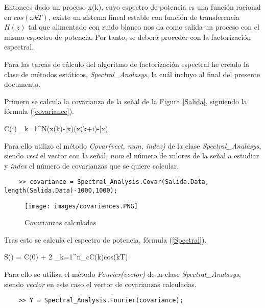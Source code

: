 \documentclass[a4paper, fontsize=11pt]{scrartcl} %
\numberwithin{equation}{section} %
\numberwithin{figure}{section} %
\numberwithin{table}{section} %
\newenvironment{myalign}{\par\nobreak\large\noindent\align}{\endalign} %
\begin{document}
	Entonces dado un proceso x(k), cuyo espectro de potencia es una función racional en $cos(\omega kT)$, existe un sistema lineal estable con función de transferencia $H(z)$ tal que alimentado con ruido blanco nos da como salida un proceso con el mismo espectro de potencia. Por tanto, se deberá proceder con la factorización espectral.
	
	Para las tareas de cálculo del algoritmo de factorización espectral he creado la clase de métodos estáticos, \textit{Spectral\_Analasys}, la cuál incluyo al final del presente documento.
	
	Primero se calcula la covarianza de la señal de la Figura \ref{Salida}, siguiendo la fórmula (\ref{covariance}). 
	
	\begin{myalign}
		C(i)\approx {} \sum_{k=1}^{N}(x(k)-\bar{x})(x(k+i)-\bar{x})
		\label{covariance}
	\end{myalign}
	
	
	Para ello utilizo el método \textit{Covar(vect, num, index)} de la clase \textit{Spectral\_Analasys}, siendo \textit{vect} el vector con la señal, \textit{num} el número de valores de la señal a estudiar y \textit{index} el número de covarianzas que se quiere calcular.
	
	\begin{lstlisting}
	>> covariance = Spectral_Analysis.Covar(Salida.Data, length(Salida.Data)-1000,1000);
	\end{lstlisting}
	
	\begin{figure}[h!]
		\centering
		\texttt{[image: images/covariances.PNG]}
		\caption{Covarianzas calculadas}
		\label{Covariances Plot}
	\end{figure}
	\FloatBarrier
	
	Tras esto se calcula el espectro de potencia, fórmula (\ref{Spectral}).
	
	\begin{myalign}
		S(\omega) = C(0) + 2 \sum_{k=1}^{n_c}C(k)cos(\omega kT)
		\label{Spectral}
	\end{myalign}	
	
	Para ello se utiliza el método \textit{Fourier(vector)} de la clase \textit{Spectral\_Analasys}, siendo \textit{vector} en este caso el vector de covarianzas calculadas.
	
	\begin{lstlisting}
	>> Y = Spectral_Analysis.Fourier(covariance);
	\end{lstlisting}
	
\end{document}

